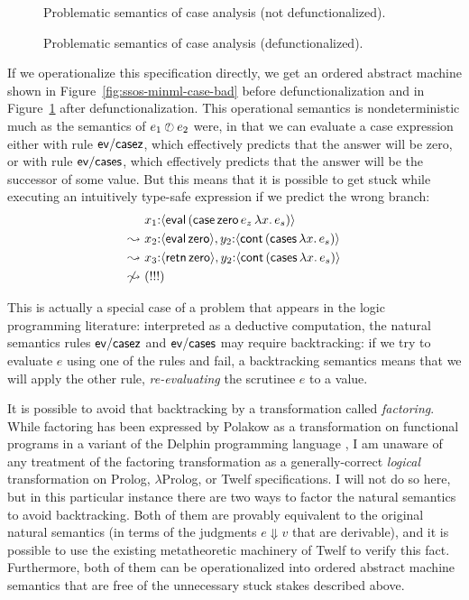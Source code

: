 \begin{figure}
\caption{Problematic semantics of case analysis (not defunctionalized).}
\label{fig:ssos-minml-case-bad}
\bigskip
{}
\caption{Problematic semantics of case analysis (defunctionalized).}
\label{fig:ssos-minml-case-bad-defun}
\end{figure}

If we operationalize this specification directly, we get an
ordered abstract machine shown in Figure~\ref{fig:ssos-minml-case-bad}
before defunctionalization and in
Figure~\ref{fig:ssos-minml-case-bad-defun} after defunctionalization.
This operational semantics is nondeterministic much as the semantics of
$e_1 \mathbin{\mbox{$\ocircle$\hspace{-7pt}{\footnotesize ?}\hspace{3pt}}} e_2$ were, in that we can evaluate a case expression either
with rule ${\sf ev/casez}$, which effectively predicts that the answer
will be zero, or with rule ${\sf ev/cases}$, which effectively predicts
that the answer will be the successor of some value. But this means that
it is possible to get stuck while executing 
an intuitively type-safe expression if we predict the wrong branch:
\begin{align*}
 & x_1{:}\langle {{\sf eval}\,({\sf case}\,{\sf zero}\,e_z\,\lambda x.\,e_s)} \rangle
\\
\leadsto ~ & 
x_2{:}\langle {{\sf eval}\,{\sf zero}} \rangle,
y_2{:}\langle {{\sf cont}\,({\sf cases}\,\lambda x.\,e_s)} \rangle
\\
\leadsto ~ & 
x_3{:}\langle {{\sf retn}\,{\sf zero}} \rangle,
y_2{:}\langle {{\sf cont}\,({\sf cases}\,\lambda x.\,e_s)} \rangle
\\
\not\leadsto ~ & (!!!)
\end{align*}

This is actually a special case of a problem that appears in the logic
programming literature: interpreted as a deductive computation, the
natural semantics rules ${\sf ev/casez}$ and ${\sf ev/cases}$ may
require backtracking: if we try to evaluate $e$ using one of the rules
and fail, a backtracking semantics means that we will apply the other
rule, {\it re-evaluating} the scrutinee $e$ to a value. 

It is possible to avoid that backtracking by a transformation called
{\it factoring}. While factoring has been expressed by Polakow as a
transformation on functional programs in a variant of the Delphin
programming language \cite{poswolsky03factoring}, I am unaware of any
treatment of the factoring transformation as a generally-correct {\it
  logical} transformation on Prolog, $\lambda$Prolog, or Twelf
specifications. I will not do so here, but in this particular instance
there are two ways to factor the natural semantics to avoid
backtracking.  Both of them are provably equivalent to the original
natural semantics (in terms of the judgments $e \Downarrow v$ that are
derivable), and it is possible to use the existing metatheoretic
machinery of Twelf to verify this fact. Furthermore, both of them can
be operationalized into ordered abstract machine semantics that are
free of the unnecessary stuck stakes described above. 


